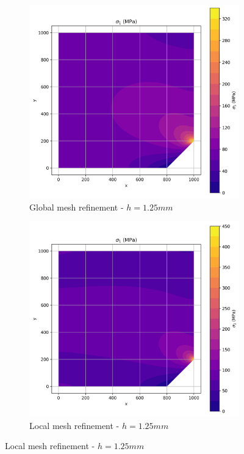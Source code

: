 \begin{figure}[H]
  \centering
  \begin{subfigure}[b]{0.45\textwidth}
    \centering
    \includegraphics[width=\textwidth]{GRAFICOS/Quad4/1.25mm_global/resultados - sigma_1.png}
    \caption{Global mesh refinement - $h=1.25mm$}
    \label{fig:img13}
  \end{subfigure}
  \hfill
  \begin{subfigure}[b]{0.45\textwidth}
    \centering
    \includegraphics[width=\textwidth]{GRAFICOS/Quad4/1.25mm_local/resultados - sigma_1.png}
    \caption{Local mesh refinement - $h=1.25mm$}
    \label{fig:img23}
  \end{subfigure}
\end{figure}

